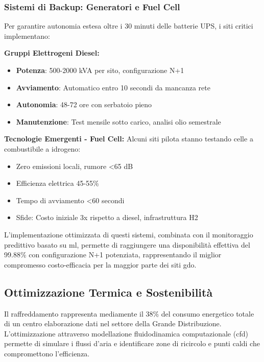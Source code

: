 \subsubsection{\texorpdfstring{\textbf{Sistemi di Backup: Generatori e Fuel Cell}}{3.2.1.4 - Sistemi di Backup: Generatori e Fuel Cell}}

Per garantire autonomia estesa oltre i 30 minuti delle batterie UPS, i siti critici implementano:

\textbf{Gruppi Elettrogeni Diesel:}
\begin{itemize}
    \item \textbf{Potenza}: 500-2000 kVA per sito, configurazione N+1
    \item \textbf{Avviamento}: Automatico entro 10 secondi da mancanza rete
    \item \textbf{Autonomia}: 48-72 ore con serbatoio pieno
    \item \textbf{Manutenzione}: Test mensile sotto carico, analisi olio semestrale
\end{itemize}

\textbf{Tecnologie Emergenti - Fuel Cell:}
Alcuni siti pilota stanno testando celle a combustibile a idrogeno:
\begin{itemize}
    \item Zero emissioni locali, rumore <65 dB
    \item Efficienza elettrica 45-55\%
    \item Tempo di avviamento <60 secondi
    \item Sfide: Costo iniziale 3x rispetto a diesel, infrastruttura H2
\end{itemize}

L'implementazione ottimizzata di questi sistemi, combinata con il monitoraggio predittivo basato su \gls{ml}, permette di raggiungere una disponibilità effettiva del 99.88\% con configurazione N+1 potenziata, rappresentando il miglior compromesso costo-efficacia per la maggior parte dei siti \gls{gdo}.
\subsection{\texorpdfstring{\textbf{Ottimizzazione Termica e Sostenibilità}}{3.2.2 - Ottimizzazione Termica e Sostenibilità}}

Il raffreddamento rappresenta mediamente il 38\% del consumo energetico totale di un centro elaborazione dati nel settore della Grande Distribuzione\autocite{ASHRAE2024}. L'ottimizzazione attraverso modellazione fluidodinamica computazionale (\gls{cfd}) permette di simulare i flussi d'aria e identificare zone di ricircolo e punti caldi che compromettono l'efficienza.

